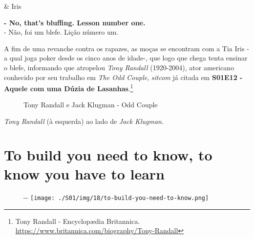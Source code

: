 \begin{tcolorbox}[enhanced,center upper,
    drop fuzzy shadow southeast, boxrule=0.3pt,
    lower separated=false, breakable,
    colframe=black!30!dialogoBorder,colback=white]
\medskip
\begin{minipage}[c]{0.16\linewidth}
   & \centering \scriptsize{Iris}
\end{minipage}
\hfill
\begin{minipage}[c]{0.8\linewidth}
  \textbf{- No, that's bluffing. Lesson number one.}\\
  - Não, foi um blefe. Lição número um.
\end{minipage}
\end{tcolorbox}

A fim de uma revanche contra os rapazes, as moças se encontram com a Tia
Iris - a qual joga poker desde os cinco anos de idade-, que logo que
chega tenta ensinar o blefe, informando que atropelou \emph{Tony
Randall} (1920-2004), ator americano conhecido por seu trabalho em
\emph{The Odd Couple}, \emph{sitcom} já citada em
\textbf{\textcolor{primarycolor}{S01E12 - Aquele com uma Dúzia de Lasanhas}}.\footnote{\sloppy Tony Randall - Encyclopædia Britannica. \url{https://www.britannica.com/biography/Tony-Randall}}

\begin{figure}
  \centering
    \caption{Tony Randall e Jack Klugman - Odd Couple\label{fig:tony-randall-e-jack-klugman-odd-couple}}
\end{figure}

\emph{Tony Randall} (à esquerda) ao lado de \emph{Jack Klugman}.

\hypertarget{to-build-you-need-to-know-to-know-you-have-to-learn}{%
\section{To build you need to know, to know you have to
learn}\label{to-build-you-need-to-know-to-know-you-have-to-learn}}

\begin{figure}[!ht]
  \begin{adjustwidth}{-\oddsidemargin-1in}{-\rightmargin}
    \centering
    \texttt{[image: ./S01/img/18/to-build-you-need-to-know.png]}
  \end{adjustwidth}
\end{figure}

